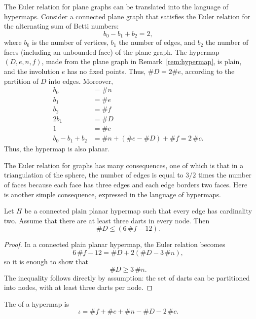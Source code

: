 \begin{remark}\label{rem:Euler}
The Euler relation for plane graphs can be translated into the
language of hypermaps.  Consider a connected plane graph that
satisfies the Euler relation for the alternating sum of Betti
numbers:
\[ b_0 - b_1 + b_2 = 2,\]  where $b_0$
is the number of vertices, $b_1$ the number of edges, and $b_2$ the
number of faces (including an unbounded face) of the plane
graph. The hypermap $(D,e,n,f)$, made from the plane graph in
Remark~\ref{rem:hypermap}, is plain, and the involution $e$ has no fixed points.  
Thus, $\# D = 2\#e$, according to the partition of $D$ into edges.  Moreover,
\begin{align*}
b_0 &= \# n\\
b_1 &= \# e\\
b_2 &= \# f\\
2b_1 &= \# D\\
1 &= \#c\\
b_0 - b_1 + b_2  &= \# n + (\#e - \#D) + \# f = 2\,\# c.
\end{align*}
Thus, the hypermap is also planar.
\end{remark}


The Euler relation for graphs has many consequences, one of which is
 that in a triangulation of the sphere, the number of
edges is equal to $3/2$ times the number of faces because each face
has three edges and each edge borders two faces.  Here is another simple
consequence, expressed in the language of hypermaps.

\begin{lemma}\label{lemma:dart-upper} 
Let $H$ be a connected plain planar hypermap such that every edge
has cardinality two.  Assume that there are at least three darts in
every node.  Then
\[ 
\# D \le (6\, \#f - 12).
\] 
\end{lemma}
%

\begin{proof}  In a connected plain planar hypermap, the Euler relation becomes
\[ 6\, \#f - 12 = \#D + 2(\#D - 3\,\#n),\] 
so it is enough to show that
\[ 
\# D \ge 3\,\#n.
\] 
The inequality follows directly by assumption: the set of darts can be
partitioned into nodes, with at least three darts per node.
\end{proof}


\begin{definition}
The  of a hypermap is
\[ \iota = \# f + \# e + \# n - \# D - 2\,\#
c.\] 
%
%
\end{definition}


